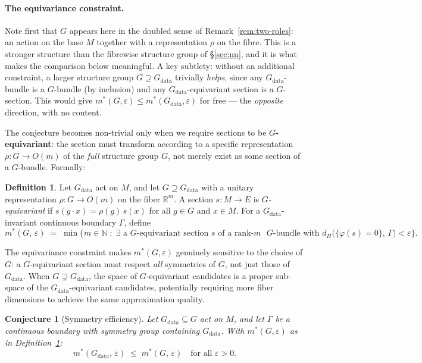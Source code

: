 \documentclass[11pt, a4paper]{article}
\theoremstyle{plain}
\newtheorem{conjecture}[theorem]{Conjecture}
\theoremstyle{definition}
\newtheorem{definition}[theorem]{Definition}
\newcommand{\R}{\mathbb{R}}
\newcommand{\Gam}{\Gamma}
\begin{document}
\paragraph{The equivariance constraint.}
Note first that $G$ appears here in the doubled sense of
Remark~\ref{rem:two-roles}: an action on the base $M$ together with a
representation $\rho$ on the fibre. This is a stronger structure than the
fibrewise structure group of \S\ref{sec:nn}, and it is what makes the
comparison below meaningful.
A key subtlety: without an additional constraint, a larger structure group
$G \supseteq G_{\mathrm{data}}$ trivially \emph{helps}, since any
$G_{\mathrm{data}}$-bundle is a $G$-bundle (by inclusion) and any
$G_{\mathrm{data}}$-equivariant section is a $G$-section. This would give
$m^*(G,\varepsilon) \leq m^*(G_{\mathrm{data}},\varepsilon)$ for free ---
the \emph{opposite} direction, with no content.

The conjecture becomes non-trivial only when we require sections to be
\textbf{$G$-equivariant}: the section must transform according to a specific
representation $\rho: G \to O(m)$ of the \emph{full} structure group $G$, not
merely exist as some section of a $G$-bundle. Formally:

\begin{definition}\label{def:mstar}
Let $G_{\mathrm{data}}$ act on $M$, and let $G \supseteq G_{\mathrm{data}}$
with a unitary representation $\rho: G \to O(m)$ on the fiber $\R^m$. A section
$s: M \to E$ is \emph{$G$-equivariant} if $s(g \cdot x) = \rho(g)\, s(x)$
for all $g \in G$ and $x \in M$. For a $G_{\mathrm{data}}$-invariant continuous
boundary $\Gam$, define
\[
  m^*(G,\, \varepsilon) \;=\; \min\bigl\{m \in \mathbb{N} \;:\;
  \exists\text{ a $G$-equivariant section }s\text{ of a rank-$m$ $G$-bundle with }
  d_H\bigl(\{\varphi(s)=0\},\,\Gam\bigr) < \varepsilon \bigr\}.
\]
\end{definition}

The equivariance constraint makes $m^*(G,\varepsilon)$ genuinely sensitive to the
choice of $G$: a $G$-equivariant section must respect \emph{all} symmetries of $G$,
not just those of $G_{\mathrm{data}}$. When $G \supsetneq G_{\mathrm{data}}$, the
space of $G$-equivariant candidates is a proper sub-space of the
$G_{\mathrm{data}}$-equivariant candidates, potentially requiring more fiber
dimensions to achieve the same approximation quality.

\begin{conjecture}[Symmetry efficiency]\label{conj:symmetry}
Let $G_{\mathrm{data}} \subseteq G$ act on $M$, and let $\Gam$ be a continuous
boundary with symmetry group containing $G_{\mathrm{data}}$. With $m^*(G,\varepsilon)$
as in Definition~\ref{def:mstar}:
\[
  m^*(G_{\mathrm{data}},\,\varepsilon) \;\leq\; m^*(G,\,\varepsilon)
  \quad \text{for all } \varepsilon > 0.
\]
\end{conjecture}
\end{document}
